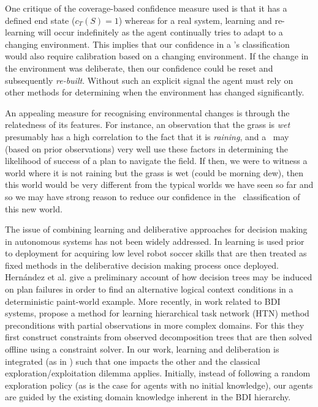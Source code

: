 One critique of the coverage-based confidence measure used is that it has a defined end state ($c_T(S)=1$) whereas for a real system, learning and re-learning will occur indefinitely as the agent continually tries to adapt to a changing environment. This implies that our confidence in a \dt's classification would also require calibration based on a changing environment. If the change in the environment was deliberate, then our confidence could be reset and subsequently \textit{re-built}. Without such an explicit signal the agent must rely on other methods for determining when the environment has changed significantly.

An appealing measure for recognising environmental changes is through the relatedness of its features. For instance, an observation that the grass is \textit{wet} presumably has a high correlation to the fact that it is \textit{raining}, and a \dt\ may (based on prior observations) very well use these factors in determining the likelihood of success of a plan to navigate the field. If then, we were to witness a world where it is not raining but the grass is wet (could be morning dew), then this world would be very different from the typical worlds we have seen so far and so we may have strong reason to reduce our confidence in the \dt\ classification of this new world.

The issue of combining learning and deliberative approaches for decision making in autonomous systems has not been widely addressed. In \cite{Riedmiller01} learning is used prior to deployment for acquiring low level robot soccer skills that are then treated as fixed methods in the deliberative decision making process once deployed. Hern\'andez et al. \cite{Hernandez04:Learning} give a preliminary account of how decision trees may be induced on plan failures in order to find an alternative logical context conditions in a deterministic paint-world example. More recently, in work related to BDI systems, \cite{Zhuo09:Learning} propose a method for learning hierarchical task network (HTN) method preconditions with partial observations in more complex domains. For this they first construct constraints from observed decomposition trees that are then solved offline using a constraint solver. In our work, learning and deliberation is integrated (as in \cite{APSS08}) such that one impacts the other and the classical exploration/exploitation dilemma applies. Initially, instead of following a random exploration policy (as is the case for agents with no initial knowledge), our agents are guided by the existing domain knowledge inherent in the BDI hierarchy.
